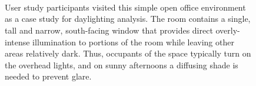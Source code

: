 \begin{figure}[t]
\begin{center}
\begin{minipage}{\figwidth}~{\color{white}{\em camera A}}\end{minipage}
\begin{minipage}{\figwidth}~{\color{white}{\em camera B}}\end{minipage}\vspace{-0.05in}\\
\caption{User study participants visited this simple open office
  environment as a case study for daylighting analysis.  The room
  contains a single, tall and narrow, south-facing window that
  provides direct overly-intense illumination to portions of the room
  while leaving other areas relatively dark.  Thus, occupants of the
  space typically turn on the overhead lights, and on sunny afternoons
  a diffusing shade is needed to prevent glare.
\label{figure:example_room}
}
\end{center}
\end{figure}
